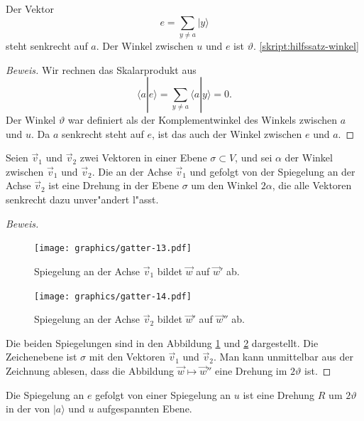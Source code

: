 \begin{hilfssatz}
Der Vektor
\[
e=\sum_{y\ne a}|y\rangle
\]
steht senkrecht auf $a$.
Der Winkel zwischen $u$ und $e$ ist $\vartheta$.
\ref{skript:hilfssatz-winkel}
\end{hilfssatz}

\begin{proof}[Beweis]
Wir rechnen das Skalarprodukt aus
\[
\langle a|e\rangle
=
\sum_{y\ne a}\langle a|y\rangle =0.
\]
Der Winkel $\vartheta$ war definiert als der Komplementwinkel
des Winkels zwischen $a$ und $u$.
Da $a$ senkrecht steht auf $e$, ist das auch der Winkel zwischen
$e$ und $a$.
\end{proof}

\begin{hilfssatz}
Seien $\vec v_1$ und $\vec v_2$ zwei Vektoren in einer Ebene
$\sigma\subset V$, und sei $\alpha$ der Winkel zwischen $\vec v_1$
und $\vec v_2$.
Die an der Achse $\vec v_1$ und gefolgt von der Spiegelung an der Achse
$\vec v_2$ ist eine Drehung in der Ebene $\sigma$ um den Winkel $2\alpha$,
die alle Vektoren senkrecht dazu unver"andert l"asst.
\label{skript:hilfssatz-drehung}
\end{hilfssatz}

\begin{proof}[Beweis]
\begin{figure}
\centering
\texttt{[image: graphics/gatter-13.pdf]}
\caption{Spiegelung an der Achse $\vec v_1$ bildet $\vec w$ auf $\vec w'$ ab.
\label{skript:drehung-spiegelung-1}}
\end{figure}
\begin{figure}
\centering
\texttt{[image: graphics/gatter-14.pdf]}
\caption{Spiegelung an der Achse $\vec v_2$ bildet $\vec w'$ auf $\vec w''$ ab.
\label{skript:drehung-spiegelung-2}}
\end{figure}
Die beiden Spiegelungen sind in den Abbildung
\ref{skript:drehung-spiegelung-1}
und
\ref{skript:drehung-spiegelung-2}
dargestellt.
Die Zeichenebene ist $\sigma$ mit den Vektoren $\vec v_1$ und $\vec v_2$.
Man kann unmittelbar aus der Zeichnung ablesen, dass
die Abbildung $\vec w\mapsto \vec w''$ eine Drehung im $2\vartheta$ ist.
\end{proof}

\begin{hilfssatz}
Die Spiegelung an $e$ gefolgt von einer Spiegelung an $u$ 
ist eine Drehung $R$ um $2\vartheta$ in der von $|a\rangle$ und $u$
aufgespannten Ebene.
\label{skript:hilfssatz-schritt}
\end{hilfssatz}

